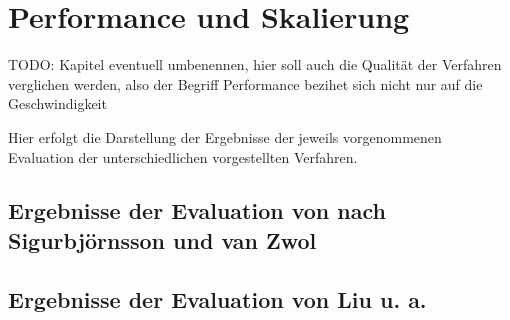 \section{Performance und Skalierung} %
\label{sec:performance_und_skalierung}
TODO: Kapitel eventuell umbenennen, hier soll auch die Qualität der Verfahren verglichen werden, also der Begriff Performance bezihet sich nicht nur auf die Geschwindigkeit


Hier erfolgt die Darstellung der Ergebnisse der jeweils vorgenommenen Evaluation der unterschiedlichen vorgestellten Verfahren.

\subsection{Ergebnisse der Evaluation von nach Sigurbjörnsson und van Zwol} %
\label{sub:ergebnisse_der_evaluation_von_collectiveknowledge}


\subsection{Ergebnisse der Evaluation von Liu u. a.} %
\label{sub:ergebnisse_der_evaluation_von_}


